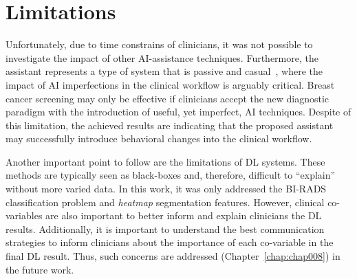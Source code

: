 \section{Limitations}
\label{sec:chap007005}

Unfortunately, due to time constrains of clinicians, it was not possible to investigate the impact of other \ac{AI}-assistance techniques.
Furthermore, the assistant represents a type of system that is passive and casual~\cite{Kocielnik:2019:YAI:3290605.3300641}, where the impact of \ac{AI} imperfections in the clinical workflow is arguably critical.
Breast cancer screening may only be effective if clinicians accept the new diagnostic paradigm with the introduction of useful, yet imperfect, \ac{AI} techniques.
Despite of this limitation, the achieved results are indicating that the proposed assistant may successfully introduce behavioral changes into the clinical workflow.

Another important point to follow are the limitations of \ac{DL} systems.
These methods are typically seen as black-boxes \cite{litjens2017survey} and, therefore, difficult to ``explain'' without more varied data.
In this work, it was only addressed the \ac{BI-RADS} classification problem and {\it heatmap} segmentation features.
However, clinical co-variables are also important to better inform and explain clinicians the \ac{DL} results.
Additionally, it is important to understand the best communication strategies to inform clinicians about the importance of each co-variable in the final \ac{DL} result.
Thus, such concerns are addressed (Chapter~\ref{chap:chap008}) in the future work.